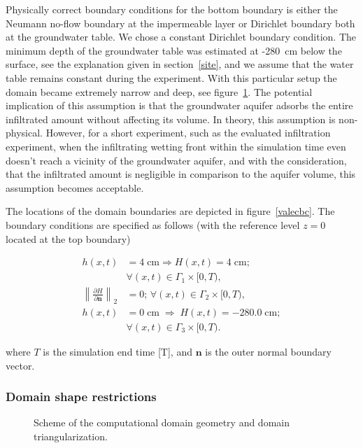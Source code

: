 \documentclass[review,times,3p,10pt]{elsarticle}
\newenvironment{lineq}
    {\begin{linenomath*}
    \begin{equation}
    }
    { 
    \end{equation} 
    \end{linenomath*}
    }
\renewcommand{\vec}{\mathbf}
\newcommand{\norm}[1]{\left\lVert#1\right\rVert}
\begin{document}
{Physically correct boundary conditions for the bottom boundary is either the Neumann no-flow boundary at the impermeable layer or Dirichlet boundary both at the groundwater table. We chose a constant Dirichlet boundary condition. {The minimum depth} of the groundwater table was estimated at -280~cm below the surface, {see the explanation given in section~\ref{site},} and  we assume that the water table remains constant during the experiment. With this particular setup the domain became extremely narrow and deep, see figure~\ref{valec}.{  The potential implication of this assumption is that the groundwater aquifer adsorbs the entire infiltrated amount without affecting its volume. In theory, this assumption is non-physical. However, for a short  experiment, such as the evaluated infiltration experiment, when the infiltrating wetting front within the simulation time even doesn't reach a vicinity of the groundwater aquifer, and  with the consideration, that the infiltrated amount is  negligible in comparison to the   aquifer volume, this assumption becomes acceptable.}





The locations of the domain boundaries are depicted in figure~\ref{valecbc}. The boundary conditions are specified as follows (with the reference level $z=0$ located at the top boundary)
{\begin{lineq} 
\label{bccond}
\begin{split}
h(x,t) &= 4 \; \mbox{cm} \Rightarrow H(x,t) = 4 \; \mbox{cm}; \\ &\forall (x,t) \in \Gamma_1 \times [0,T), \\
\norm{\frac{\partial H}{\partial \vec{n}}}_2 &= 0; \, \forall (x,t) \in \Gamma_2 \times [0,T), \\
h(x,t) &= 0  \; \mbox{cm}  \; \Rightarrow \; H(x,t) = -280.0  \; \mbox{cm}; \\ &\forall (x,t) \in \Gamma_3 \times [0,T).
\end{split}
\end{lineq}}
where $T$ is the simulation end time [T], and $\vec{n}$ is the outer normal boundary vector.

\subsubsection{Domain shape restrictions}
\label{shaperestr}

 \begin{figure}
\centering
{}
 \caption{Scheme of the computational domain geometry and domain triangularization.}
 \label{valec}
\end{figure}


}
\end{document}
